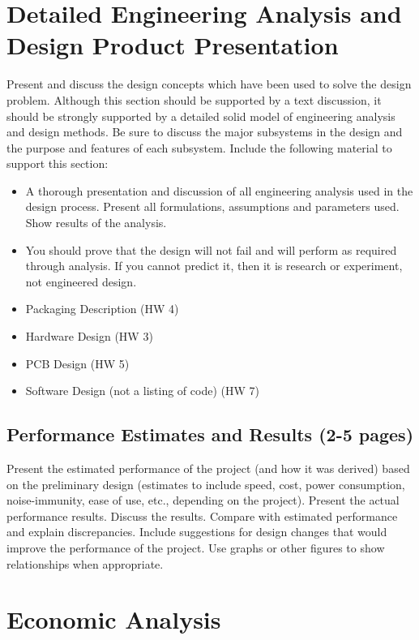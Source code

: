 \documentclass[12pt]{article}
\begin{document}
\section{Detailed Engineering Analysis and Design Product Presentation}
Present and discuss the design concepts which have been used to solve the design problem. Although this section should be supported by a text discussion, it should be strongly supported by a detailed solid model of engineering analysis and design methods. Be sure to discuss the major subsystems in the design and the purpose and features of each subsystem. Include the following material to support this section:
\begin{itemize}[noitemsep]
    \item A thorough presentation and discussion of all engineering analysis used in the design process. Present all formulations, assumptions and parameters used. Show results of the analysis.
    \item You should prove that the design will not fail and will perform as required through analysis. If you cannot predict it, then it is research or experiment, not engineered design.
    \item Packaging Description (HW 4)
    \item Hardware Design (HW 3)
    \item PCB Design (HW 5)
    \item Software Design (not a listing of code) (HW 7)
\end{itemize}

\subsection{Performance Estimates and Results (2-5 pages)}
Present the estimated performance of the project (and how it was derived) based on the preliminary design (estimates to include speed, cost, power consumption, noise-immunity, ease of use, etc., depending on the project). Present the actual performance results. Discuss the results. Compare with estimated performance and explain discrepancies. Include suggestions for design changes that would improve the performance of the project. Use graphs or other figures to show relationships when appropriate.

\section{Economic Analysis}
\end{document}
